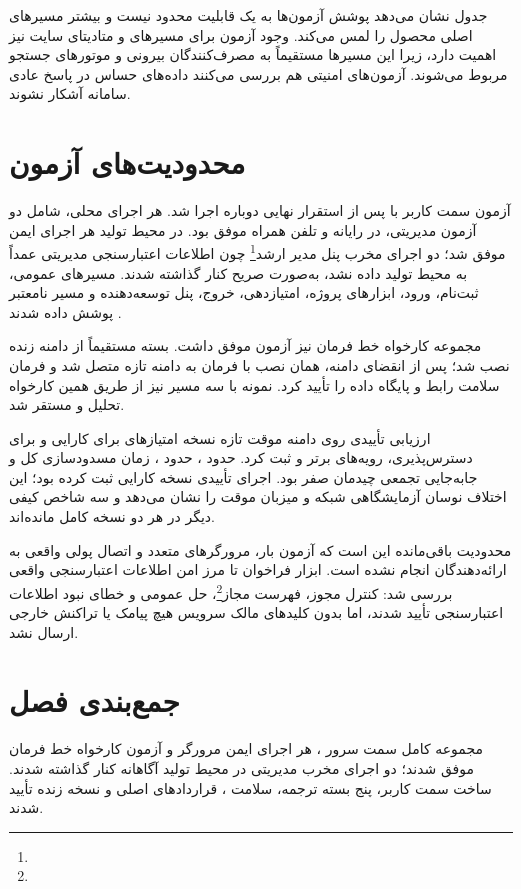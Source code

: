 جدول نشان می‌دهد پوشش آزمون‌ها به یک قابلیت محدود نیست و بیشتر مسیرهای اصلی محصول را لمس می‌کند. وجود آزمون برای مسیرهای  و متادیتای سایت نیز اهمیت دارد، زیرا این مسیرها مستقیماً به مصرف‌کنندگان بیرونی و موتورهای جستجو مربوط می‌شوند. آزمون‌های امنیتی هم بررسی می‌کنند داده‌های حساس در پاسخ عادی سامانه آشکار نشوند.

\section{محدودیت‌های آزمون}
آزمون سمت کاربر با  پس از استقرار نهایی دوباره اجرا شد. هر  اجرای محلی، شامل دو آزمون مدیریتی، در رایانه و تلفن همراه موفق بود. در محیط تولید هر  اجرای ایمن موفق شد؛ دو اجرای مخرب پنل مدیر ارشد\footnote{} چون اطلاعات اعتبارسنجی مدیریتی عمداً به محیط تولید داده نشد، به‌صورت صریح کنار گذاشته شدند. مسیرهای عمومی، ثبت‌نام، ورود، ابزارهای پروژه، امتیازدهی، خروج، پنل توسعه‌دهنده و مسیر نامعتبر پوشش داده شدند \cite{playwright}.

مجموعه کارخواه خط فرمان نیز  آزمون موفق داشت. بسته مستقیماً از دامنه زنده نصب شد؛ پس از انقضای دامنه، همان نصب با فرمان  به دامنه تازه متصل شد و فرمان  سلامت رابط و پایگاه داده را تأیید کرد. نمونه  با سه مسیر نیز از طریق همین کارخواه تحلیل و مستقر شد.

ارزیابی تأییدی  روی دامنه موقت تازه نسخه  امتیازهای  برای کارایی و  برای دسترس‌پذیری، رویه‌های برتر و  ثبت کرد.  حدود ،  حدود ، زمان مسدودسازی کل  و جابه‌جایی تجمعی چیدمان صفر بود. اجرای تأییدی نسخه  کارایی  ثبت کرده بود؛ این اختلاف نوسان آزمایشگاهی شبکه و میزبان موقت را نشان می‌دهد و سه شاخص کیفی دیگر در هر دو نسخه کامل مانده‌اند.

محدودیت باقی‌مانده این است که آزمون بار، مرورگرهای متعدد و اتصال پولی واقعی به ارائه‌دهندگان انجام نشده است. ابزار فراخوان تا مرز امن اطلاعات اعتبارسنجی واقعی بررسی شد: کنترل مجوز، فهرست مجاز\footnote{}، حل  عمومی و خطای نبود اطلاعات اعتبارسنجی تأیید شدند، اما بدون کلیدهای مالک سرویس هیچ پیامک یا تراکنش خارجی ارسال نشد.

\section{جمع‌بندی فصل}
مجموعه کامل سمت سرور ، هر  اجرای ایمن مرورگر و  آزمون کارخواه خط فرمان موفق شدند؛ دو اجرای مخرب مدیریتی در محیط تولید آگاهانه کنار گذاشته شدند. ساخت سمت کاربر، پنج بسته ترجمه، سلامت ، قراردادهای اصلی و نسخه زنده  تأیید شدند.
